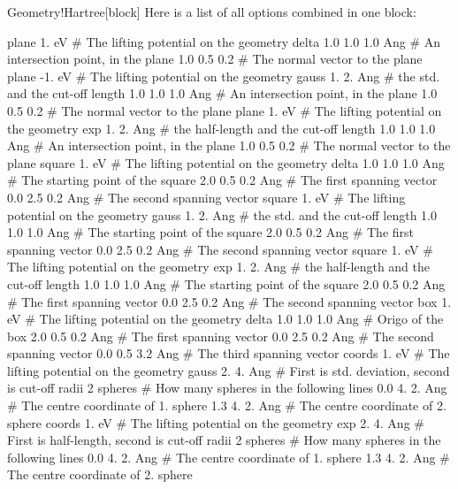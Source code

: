 \begin{fdfentry}{Geometry!Hartree}[block]
    Here is a list of all options combined in one block:
    \begin{fdfexample}
   plane   1. eV       # The lifting potential on the geometry
     delta
      1.0 1.0 1.0 Ang  # An intersection point, in the plane
      1.0 0.5 0.2      # The normal vector to the plane
   plane  -1. eV       # The lifting potential on the geometry
     gauss 1. 2.  Ang  # the std. and the cut-off length
      1.0 1.0 1.0 Ang  # An intersection point, in the plane
      1.0 0.5 0.2      # The normal vector to the plane
   plane   1. eV       # The lifting potential on the geometry
     exp 1. 2. Ang     # the half-length and the cut-off length
      1.0 1.0 1.0 Ang  # An intersection point, in the plane
      1.0 0.5 0.2      # The normal vector to the plane
   square  1. eV       # The lifting potential on the geometry
     delta
      1.0 1.0 1.0 Ang  # The starting point of the square
      2.0 0.5 0.2 Ang  # The first spanning vector
      0.0 2.5 0.2 Ang  # The second spanning vector
   square  1. eV       # The lifting potential on the geometry
     gauss 1. 2. Ang   # the std. and the cut-off length
      1.0 1.0 1.0 Ang  # The starting point of the square
      2.0 0.5 0.2 Ang  # The first spanning vector
      0.0 2.5 0.2 Ang  # The second spanning vector
   square  1. eV       # The lifting potential on the geometry
     exp 1. 2. Ang     # the half-length and the cut-off length
      1.0 1.0 1.0 Ang  # The starting point of the square
      2.0 0.5 0.2 Ang  # The first spanning vector
      0.0 2.5 0.2 Ang  # The second spanning vector
   box  1. eV          # The lifting potential on the geometry
     delta
      1.0 1.0 1.0 Ang  # Origo of the box
      2.0 0.5 0.2 Ang  # The first spanning vector
      0.0 2.5 0.2 Ang  # The second spanning vector
      0.0 0.5 3.2 Ang  # The third spanning vector
   coords 1. eV        # The lifting potential on the geometry
      gauss 2. 4. Ang  # First is std. deviation, second is cut-off radii
         2 spheres     # How many spheres in the following lines
         0.0 4. 2. Ang # The centre coordinate of 1. sphere
         1.3 4. 2. Ang # The centre coordinate of 2. sphere
   coords 1. eV        # The lifting potential on the geometry
      exp 2. 4. Ang    # First is half-length, second is cut-off radii
         2 spheres     # How many spheres in the following lines
         0.0 4. 2. Ang # The centre coordinate of 1. sphere
         1.3 4. 2. Ang # The centre coordinate of 2. sphere
       \end{fdfexample}
  
  \end{fdfentry}
  
